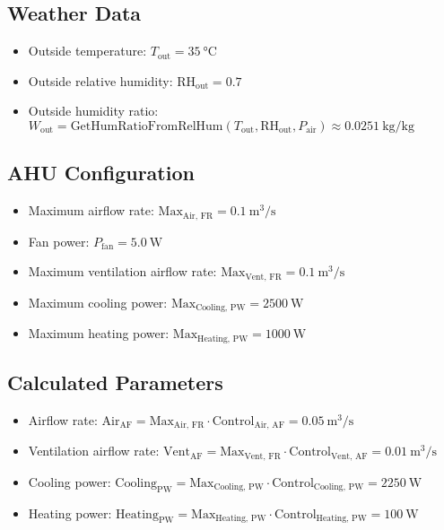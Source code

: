 \documentclass[12pt]{article}
\begin{document}
\subsection{Weather Data}
\begin{itemize}
    \item Outside temperature: \( T_{\text{out}} = \SI{35}{\celsius} \)
    \item Outside relative humidity: \( \text{RH}_{\text{out}} = 0.7 \)
    \item Outside humidity ratio: \( W_{\text{out}} = \text{GetHumRatioFromRelHum}(T_{\text{out}}, \text{RH}_{\text{out}}, P_{\text{air}}) \approx \SI{0.0251}{\kilo\gram\per\kilo\gram} \)
\end{itemize}

\subsection{AHU Configuration}
\begin{itemize}
    \item Maximum airflow rate: \( \text{Max}_{\text{Air, FR}} = \SI{0.1}{\meter\cubed\per\second} \)
    \item Fan power: \( P_{\text{fan}} = \SI{5.0}{\watt} \)
    \item Maximum ventilation airflow rate: \( \text{Max}_{\text{Vent, FR}} = \SI{0.1}{\meter\cubed\per\second} \)
    \item Maximum cooling power: \( \text{Max}_{\text{Cooling, PW}} = \SI{2500}{\watt} \)
    \item Maximum heating power: \( \text{Max}_{\text{Heating, PW}} = \SI{1000}{\watt} \)
\end{itemize}

\subsection{Calculated Parameters}
\begin{itemize}
    \item Airflow rate: \( \text{Air}_{\text{AF}} = \text{Max}_{\text{Air, FR}} \cdot \text{Control}_{\text{Air, AF}} = \SI{0.05}{\meter\cubed\per\second} \)
    \item Ventilation airflow rate: \( \text{Vent}_{\text{AF}} = \text{Max}_{\text{Vent, FR}} \cdot \text{Control}_{\text{Vent, AF}} = \SI{0.01}{\meter\cubed\per\second} \)
    \item Cooling power: \( \text{Cooling}_{\text{PW}} = \text{Max}_{\text{Cooling, PW}} \cdot \text{Control}_{\text{Cooling, PW}} = \SI{2250}{\watt} \)
    \item Heating power: \( \text{Heating}_{\text{PW}} = \text{Max}_{\text{Heating, PW}} \cdot \text{Control}_{\text{Heating, PW}} = \SI{100}{\watt} \)
\end{itemize}
\end{document}

